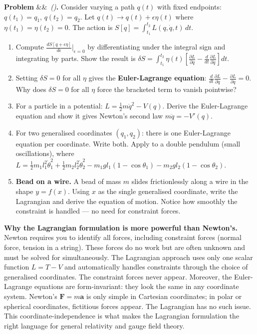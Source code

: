 \documentclass[12pt,a4paper]{article}
\newcounter{problem}
\newenvironment{problem}[1][]{\refstepcounter{problem}\par\vspace{6pt}\noindent\textbf{\color{MidBlue}Problem \theproblem}\ifx&#1&\else\ \textit{(#1)}\fi\textbf{.}\enskip}{\par\vspace{4pt}}
\begin{document}
\begin{problem}
\label{prob:EL}
Consider varying a path $q(t)$ with fixed endpoints: $q(t_1)=q_1$, $q(t_2)=q_2$. Let $q(t)\to q(t)+\epsilon\eta(t)$ where $\eta(t_1)=\eta(t_2)=0$. The action is $S[q]=\int_{t_1}^{t_2}L(q,\dot q,t)\,dt$.
\begin{enumerate}[label=(\alph*),topsep=2pt]
  \item Compute $\frac{dS[q+\epsilon\eta]}{d\epsilon}\Big|_{\epsilon=0}$ by differentiating under the integral sign and integrating by parts. Show the result is
  $\delta S = \int_{t_1}^{t_2}\eta(t)\left[\frac{\partial L}{\partial q}-\frac{d}{dt}\frac{\partial L}{\partial\dot q}\right]dt$.
  \item Setting $\delta S=0$ for all $\eta$ gives the \textbf{Euler-Lagrange equation}:
  $\frac{d}{dt}\frac{\partial L}{\partial\dot q} - \frac{\partial L}{\partial q} = 0$.
  Why does $\delta S=0$ for all $\eta$ force the bracketed term to vanish pointwise?
  \item For a particle in a potential: $L = \frac{1}{2}m\dot q^2 - V(q)$. Derive the Euler-Lagrange equation and show it gives Newton's second law $m\ddot q = -V'(q)$.
  \item For two generalised coordinates $(q_1,q_2)$: there is one Euler-Lagrange equation per coordinate. Write both. Apply to a double pendulum (small oscillations), where $L = \frac{1}{2}m_1l_1^2\dot\theta_1^2+\frac{1}{2}m_2l_2^2\dot\theta_2^2 - m_1gl_1(1-\cos\theta_1)-m_2gl_2(1-\cos\theta_2)$.
  \item \textbf{Bead on a wire.} A bead of mass $m$ slides frictionlessly along a wire in the shape $y=f(x)$. Using $x$ as the single generalised coordinate, write the Lagrangian and derive the equation of motion. Notice how smoothly the constraint is handled --- no need for constraint forces.
\end{enumerate}
\end{problem}

\begin{thought}
\textbf{Why the Lagrangian formulation is more powerful than Newton's.}
Newton requires you to identify all forces, including constraint forces (normal force, tension in a string). These forces do no work but are often unknown and must be solved for simultaneously. The Lagrangian approach uses only one scalar function $L = T-V$ and automatically handles constraints through the choice of generalised coordinates. The constraint forces never appear. Moreover, the Euler-Lagrange equations are form-invariant: they look the same in any coordinate system. Newton's $\mathbf{F}=m\mathbf{a}$ is only simple in Cartesian coordinates; in polar or spherical coordinates, fictitious forces appear. The Lagrangian has no such issue. This coordinate-independence is what makes the Lagrangian formulation the right language for general relativity and gauge field theory.
\end{thought}
\end{document}
